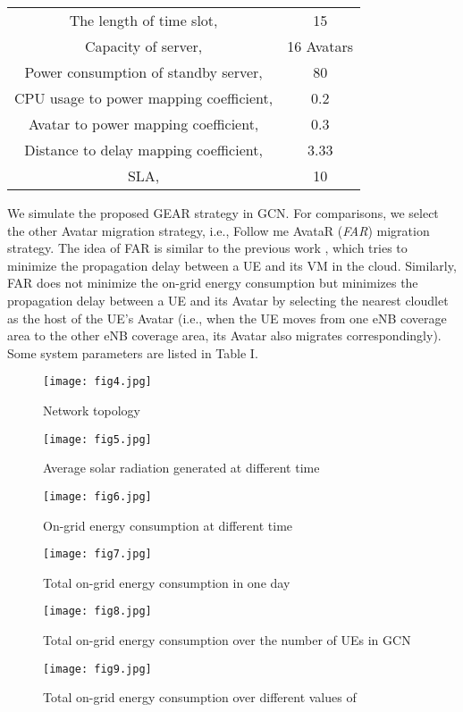 \documentclass[journal,12pt,draftclsnofoot,onecolumn]{IEEEtran}
\begin{document}
\begin{titlepage}
\begin{center}
\begin{table}[!htb]
\begin{tabular}{c c}
		\hline
		
		The length of time slot,    &   15 \\
		
		Capacity of server,      &   16 Avatars\\ 
		
		Power consumption of standby server,  & 80 \\
		
		CPU usage to power mapping coefficient,  &  0.2  \\
		
		Avatar to power mapping coefficient, 		&    0.3 \\
	
		Distance to delay mapping coefficient,  & 3.33 \\ 
	
		SLA,   &  10 \\
	
		\hline
		\hline
	\end{tabular}
\end{table}
We simulate the proposed GEAR strategy in GCN. For comparisons, we select the other Avatar migration strategy, i.e., Follow me AvataR (\emph{FAR}) migration strategy. The idea of FAR is similar to the previous work \cite{7}, which tries to minimize the propagation delay between a UE and its VM in the cloud. Similarly, FAR does not minimize the on-grid energy consumption but minimizes the propagation delay between a UE and its Avatar by selecting the nearest cloudlet as the host of the UE's Avatar (i.e., when the UE moves from one eNB coverage area to the other eNB coverage area, its Avatar also migrates correspondingly). Some system parameters are listed in Table I.\
\begin{figure}[!htb]
	\centering	
\texttt{[image: fig4.jpg]}
	\caption{Network topology}
	\label{fig4}
\end{figure}
\begin{figure}[!htb]
	\centering	
\texttt{[image: fig5.jpg]}
	\caption{Average solar radiation generated at different time}
	\label{fig5}
\end{figure}
\begin{figure}[!htb]
	\centering	
\texttt{[image: fig6.jpg]}
	\caption{On-grid energy consumption at different time}
	\label{fig6}
\end{figure}
\begin{figure}[!htb]
	\centering	
\texttt{[image: fig7.jpg]}
	\caption{Total on-grid energy consumption in one day}	
	\label{fig7}
\end{figure}
\begin{figure}[!htb]
	\centering	
\texttt{[image: fig8.jpg]}
	\caption{Total on-grid energy consumption over the  number of UEs in GCN}
	\label{fig8}
\end{figure}
\begin{figure}[!htb]
	\centering	
\texttt{[image: fig9.jpg]}
	\caption{Total on-grid energy consumption over different values of }	
	\label{fig9}
\end{figure}


\end{center}
\end{titlepage}
\end{document}
